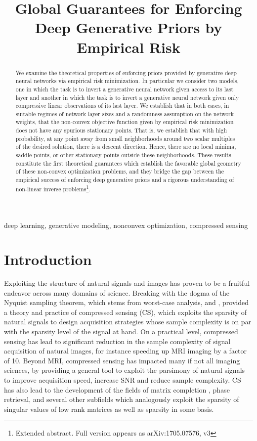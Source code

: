 \documentclass[final,12pt]{colt2018}
\title[Deep Generative Priors]{Global Guarantees for Enforcing Deep Generative Priors by Empirical Risk}
\begin{document}
\maketitle

\begin{abstract}
We examine the theoretical properties of enforcing priors provided by generative deep neural networks via empirical risk minimization. In particular we consider two models, one in which the task is to invert a generative neural network given access to its last layer and another in which the task is to invert a generative neural network given only compressive linear observations of its last layer.  We establish that in both cases, in suitable regimes of network layer sizes and a randomness assumption on the network weights, that the non-convex objective function given by empirical risk minimization does not have any spurious stationary points. That is, we establish that with high probability, at any point away from small neighborhoods around two scalar multiples of the desired solution, there is a descent direction. Hence, there are no local minima, saddle points, or other stationary points outside these neighborhoods.  These results constitute the first theoretical guarantees which establish the favorable global geometry of these non-convex optimization problems, and they bridge the gap between the empirical success of  enforcing deep generative priors and a rigorous understanding of non-linear inverse problems\footnote{Extended abstract. Full version appears as arXiv:1705.07576, v3}.\\
\end{abstract}

\begin{keywords}
deep learning, generative modeling, nonconvex optimization, compressed sensing
\end{keywords}

\section{Introduction}
Exploiting the structure of natural signals and images has proven to be a fruitful endeavor across many domains of science. Breaking with the dogma of the Nyquist sampling theorem, which stems from worst-case analysis, \cite{CRT2005} and \cite{Donoho}, provided a theory and practice of compressed sensing (CS), which exploits the sparsity of natural signals to design acquisition strategies whose sample complexity is on par with the sparsity level of the signal at hand. On a practical level, compressed sensing has lead to significant reduction in the sample complexity of signal acquisition of natural images, for instance speeding up MRI imaging by a factor of 10. Beyond MRI, compressed sensing has impacted many if not all imaging sciences, by providing a general tool to exploit the parsimony of natural signals to improve acquisition speed, increase SNR and reduce sample complexity. CS has also lead to the development of the fields of matrix completion \citep{MC}, phase retrieval, \citep{CSV2013, CESV2011} and several other subfields \citep{BDC} which analogously exploit the sparsity of singular values of low rank matrices as well as sparsity in some basis. 
\end{document}
